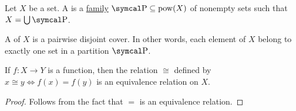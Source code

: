 \begin{definition}\label{def:set_partition}
  Let \( X \) be a set. A  is a \hyperref[remark:family_of_sets]{family} \( \CP \subseteq \Pow(X) \) of nonempty sets such that \( X = \bigcup \CP \).

  A  of \( X \) is a pairwise disjoint cover. In other words, each element of \( X \) belong to exactly one set in a partition \( \CP \).
\end{definition}

\begin{lemma}\label{thm:equivalence_relation_inheriance}
  If \( f: X \to Y \) is a function, then the relation \( \cong \) defined by \( x \cong y \iff f(x) = f(y) \) is an equivalence relation on \( X \).
\end{lemma}
\begin{proof}
  Follows from the fact that \( = \) is an equivalence relation.
\end{proof}

